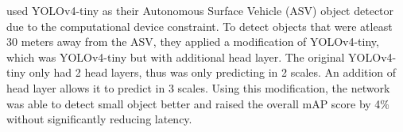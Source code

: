  \textcite{barunastra} used YOLOv4-tiny as their Autonomous Surface Vehicle (ASV) object detector due to the computational
  device constraint.
  To detect objects that were atleast 30 meters away from the ASV, they applied a modification of YOLOv4-tiny, which was YOLOv4-tiny
  but with additional head layer. The original YOLOv4-tiny only had 2 head layers, thus was only predicting in 2 scales.
  An addition of head layer allows it to predict in 3 scales. Using this modification, the network was able to detect small object
  better and raised the overall mAP score by 4\% without significantly reducing latency.

